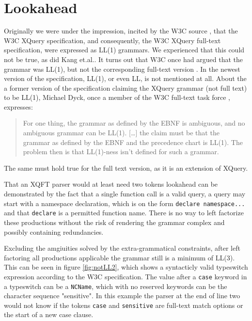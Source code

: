 \section{Lookahead}
\label{sect:discussion:lookahead}
Originally we were under the impression, incited by the W3C source \cite{createTokenizer}, that the W3C XQuery specification, and consequently, the W3C XQuery full-text specification, were expressed as LL(1) grammars. We experienced that this could not be true, as did Kang et.al.\cite{kang_xquery_diglib}. It turns out that W3C once had argued that the grammar was LL(1), but not the corresponding full-text version \cite{grammarIsLL1}. In the newest version of the specification, LL(1), or even LL, is not mentioned at all. About the a former version of the specification claiming the XQuery grammar (not full text) to be LL(1), Michael Dyck, once a member of the W3C full-text task force \cite{dyckIsTaskForce}, expresses\cite{dyckOnList}:
\begin{quote}
For one thing, the grammar as defined by the EBNF is ambiguous, and no ambiguous grammar can be LL(1). [\ldots] the claim must be that the grammar as defined by the EBNF and the precedence chart is LL(1). The problem then is that LL(1)-ness isn't defined for such a grammar.
\end{quote}
The same must hold true for the full text version, as it is an extension of XQuery.

That an XQFT parser would at least need two tokens lookahead can be
demonstrated by the fact that a single function call is a valid query, a query
may start with a namespace declaration, which is on the form 
\verb!declare namespace...! and that \verb!declare! is a permitted function
name. There is no way to left factorize these productions without the risk of
rendering the grammar complex and possibly containing redundancies.     

Excluding the amgiuities solved by the extra-grammatical constraints, after left factoring all productions applicable the grammar still is a minimum of LL(3). This can be seen in figure \ref{fig:notLL2}, which shows a syntacticly valid typeswitch expression according to the W3C specification. The value after a \verb!case! keyword in a typeswitch can be a \verb!NCName!, which with no reserved keywords can be the character sequence "sensitive". In this example the parser at the end of line two would not know if the tokens \verb!case! and \verb!sensitive! are full-text match options or the start of a new case clause.

